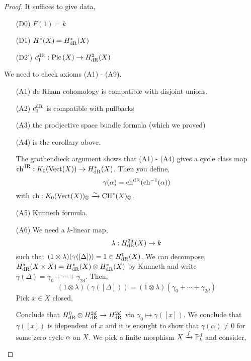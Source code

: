 \documentclass[12pt]{article}
\begin{document}
\begin{proof}
It suffices to give data,
\begin{enumerate}
\item[(D0)] $F(1) = k$
\item[(D1)] $H^*(X) = H_{\dR}^*(X)$
\item[(D2')] $c_1^{\dR} : \Pic{X} \to H^2_{\dR}(X)$
\end{enumerate}
We need to check axioms (A1) - (A9). 
\begin{enumerate}
\item[(A1)] de Rham cohomology is compatible with disjoint unions.
\item[(A2)] $c_1^{\dR}$ is compatible with pullbacks
\item[(A3)] the prodjective space bundle formula (which we proved)
\item[(A4)] is the corollary above. 
\begin{remark}
The grothendieck argument shows that (A1) - (A4) gives a cycle class map $\chern^{\dR} : K_0(\Vect(X))  \to H^*_{\dR}(X)$. Then you define,
\[ \gamma(\alpha) = \chern^{\dR}(\chern^{-1}(\alpha)) \]
with $\chern : K_0(\Vect(X))_\Q \xrightarrow{\sim} \CH^*(X)_\Q$.
\end{remark}
\item[(A5)] Kunneth formula.
\item[(A6)] We need a  $k$-linear map,
\[ \lambda : H^{2d}_{\dR}(X) \to k \]
such that $(1 \otimes \lambda)(\gamma([\Delta])) = 1 \in H^0_{\dR}(X)$. We can decompose, $H^*_{\dR}(X \times X) = H^*_{\dR}(X) \otimes H^*_{\dR}(X)$ by Kunneth and write $\gamma(\Delta) = \gamma_0 + \cdots + \gamma_{2d}$. Then,
\[ (1 \otimes \lambda) (\gamma([\Delta])) = (1 \otimes \lambda)(\gamma_0 + \cdots + \gamma_{2d}) \]
Pick $x \in X$ closed,
\begin{center}
\end{center}
Conclude that $H^0_{\dR} \otimes H^{2d}_{\dR} \to H^{2d}_{\dR}$ via $\gamma_0 \mapsto \gamma([x])$. We conclude that $\gamma([x])$ is idependent of $x$ and it is enought to show that $\gamma(\alpha) \neq 0$ for some zero cycle $\alpha$ on $X$. We pick a finite morphism $X \xrightarrow{f} \P^d_k$ and consider,
\begin{center}
\end{center}
\end{enumerate}
\end{proof}
\end{document}

